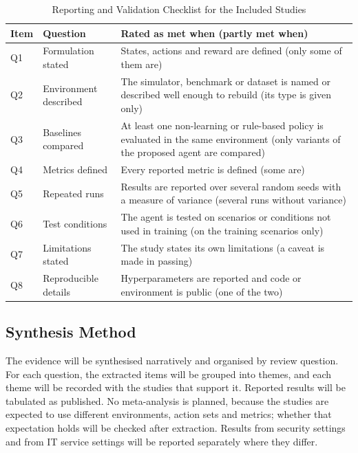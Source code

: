 \documentclass[journal]{IEEEtran}
\begin{document}
\begin{table}[!t]
\centering
\caption{Reporting and Validation Checklist for the Included Studies}
\label{tab:quality}
\footnotesize
\begin{tabularx}{\columnwidth}{@{}lp{1.9cm}L@{}}
\toprule
Item & Question & Rated as met when (partly met when) \\
\midrule
Q1 & Formulation stated & States, actions and reward are defined (only some of them are) \\
Q2 & Environment described & The simulator, benchmark or dataset is named or described well enough to rebuild (its type is given only) \\
Q3 & Baselines compared & At least one non-learning or rule-based policy is evaluated in the same environment (only variants of the proposed agent are compared) \\
Q4 & Metrics defined & Every reported metric is defined (some are) \\
Q5 & Repeated runs & Results are reported over several random seeds with a measure of variance (several runs without variance) \\
Q6 & Test conditions & The agent is tested on scenarios or conditions not used in training (on the training scenarios only) \\
Q7 & Limitations stated & The study states its own limitations (a caveat is made in passing) \\
Q8 & Reproducible details & Hyperparameters are reported and code or environment is public (one of the two) \\
\bottomrule
\end{tabularx}
\end{table}

\subsection{Synthesis Method}

The evidence will be synthesised narratively and organised by review question. For each question, the extracted items will be grouped into themes, and each theme will be recorded with the studies that support it. Reported results will be tabulated as published. No meta-analysis is planned, because the studies are expected to use different environments, action sets and metrics; whether that expectation holds will be checked after extraction. Results from security settings and from IT service settings will be reported separately where they differ.
\end{document}
